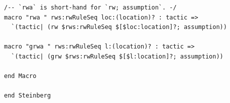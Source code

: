 \begin{Verbatim}
/-- `rwa` is short-hand for `rw; assumption`. -/
macro "rwa " rws:rwRuleSeq loc:(location)? : tactic =>
  `(tactic| (rw $rws:rwRuleSeq $[$loc:location]?; assumption))

macro "grwa " rws:rwRuleSeq l:(location)? : tactic =>
  `(tactic| (grw $rws:rwRuleSeq $[$l:location]?; assumption))

end Macro

end Steinberg
\end{Verbatim}
